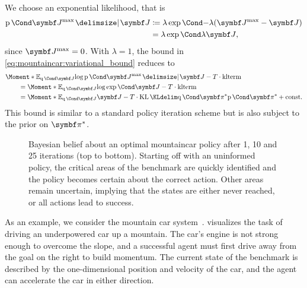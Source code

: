 We choose an exponential likelihood, that is
\begin{equation}
    \begin{split}
        \Prob{\mat{J}^\text{max} \given \mat{J}}
        &\coloneqq \lambda \Fun{\exp}{-\lambda (\mat{J}^\text{max} - \mat{J})} \\
        &= \lambda \Fun{\exp}{\lambda \mat{J}},
    \end{split}
\end{equation}
since $\mat{J}^\text{max} = 0$.
With $\lambda = 1$, the bound in \cref{eq:mountaincar:variational_bound} reduces to
\begin{equation}
    \begin{split}
        \MoveEqLeft\Moment*{\E_{\Variat{\mat{J}}}}{\log \Prob{\mat{J}^{\text{max}} \given \mat{J}}} - T \cdot \text{klterm}
        \\
        &= \Moment*{\E_{\Variat{\mat{J}}}}{\log \Fun{\exp}{\mat{J}}} - T \cdot \text{klterm}
        \\
        &= \Moment*{\E_{\Variat{\mat{J}}}}{\mat{J}} - T \cdot \KL{\Variat{\mat{\pi}^\ast}}{\Prob{\mat{\pi}^\ast}} + \text{const}.
    \end{split}
\end{equation}
This bound is similar to a standard policy iteration scheme but is also subject to the prior on $\mat{\pi}^\ast$.

\begin{figure}[tp]
    \centering
    
    
    
    \caption[A probabilistic mountaincar policy]{
        \label{fig:mountaincar:policy}
        Bayesian belief about an optimal mountaincar policy after 1, 10 and 25 iterations (top to bottom).
        Starting off with an uninformed policy, the critical areas of the benchmark are quickly identified and the policy becomes certain about the correct action.
        Other areas remain uncertain, implying that the states are either never reached, or all actions lead to success.
    }
\end{figure}
As an example, we consider the mountain car system~\parencite{moore_efficient_1990,sutton_reinforcement_2018}.
 visualizes the task of driving an underpowered car up a mountain.
The car's engine is not strong enough to overcome the slope, and a successful agent must first drive away from the goal on the right to build momentum.
The current state of the benchmark is described by the one-dimensional position and velocity of the car, and the agent can accelerate the car in either direction.


